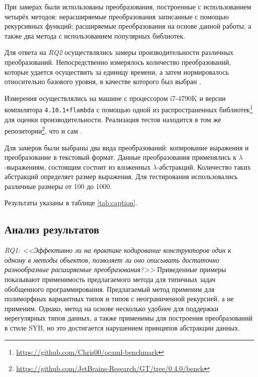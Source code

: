 %



При замерах были использованы преобразования, построенные с использованием четырёх методов:
нерасширяемые преобразования записанные с помощью рекурсивных функций;
расширяемые преобразования на основе данной работы; 
а также два метода с использованием популярных библиотек.

Для ответа на \textit{RQ2} осуществлялись замеры производительности различных преобразований. Непосредственно измерялось количество преобразований, которые удается осуществить за единицу времени, а затем нормировалось относительно базового уровня, в качестве которого был выбран \GT{}.

Измерения осуществлялись на машине с процессором i7-4790K и версии компилятора \texttt{4.10.1+flambda} с помощью одной из распространенных библиотек\footnote{\url{https://github.com/Chris00/ocaml-benchmark}} для оценки производительности. Реализация тестов находится в том же репозитории\footnote{\url{https://github.com/JetBrains-Research/GT/tree/0.4.0/bench}}, что и сам \GT{}.

Для замеров были выбраны два вида преобразований: копирование выражения и преобразование в текстовый формат.
Данные преобразования применялись к $\lambda$-выражениям, состоящим состоит из вложенных $\lambda$-абстракций.
Количество таких абстракций определяет размер выражения. Для тестирования использовались различные размеры от 100 до 1000.

Результаты указаны в таблице \ref{tab:caption}.

\subsection{Анализ результатов}
\emph{RQ1: <<Эффективно ли  на практике кодирование конструкторов один к одному в методы объектов, позволяет ли оно описывать достаточно разнообразные расширяемые преобразования?>>} Приведенные примеры показывают применимость  предлагаемого метода для типичных задач обобщенного программирования. Предлагаемый метод применим для полиморфных вариантных типов \OCaml{} и типов с неограниченной рекурсией, а \Visitors{} не применим. Однако, метод на основе \Visitors{} несколько удобнее для поддержки нерегулярных типов данных, а также \Visitors{} применимы для построения преобразований в стиле SYB\cite{SYB}, но это достигается нарушением принципов абстракции данных.

